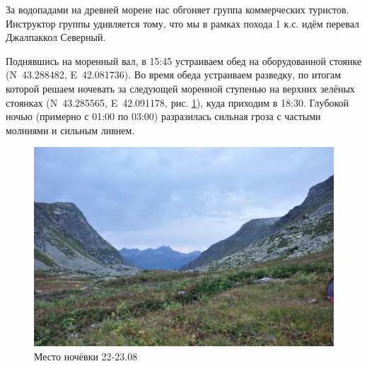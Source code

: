 За водопадами на древней морене нас обгоняет группа коммерческих туристов. Инструктор группы удивляется тому, что мы в рамках похода 1 к.с. идём перевал Джалпаккол Северный.

Поднявшись на моренный вал, в 15:45 устраиваем обед на оборудованной стоянке (N~43.288482\degree, E~42.081736\degree). Во время обеда устраиваем разведку, по итогам которой решаем ночевать за следующей моренной ступенью на верхних зелёных стоянках (N~43.285565\degree, E~42.091178\degree, рис. \ref{fig:DSC_0018}), куда приходим в 18:30. Глубокой ночью (примерно с 01:00 по 03:00) разразилась сильная гроза с частыми молниями и сильным ливнем.

\begin{figure}[h!]
	\centering
	\includegraphics[width=0.7\linewidth]{../pics/DSC_0018}
	\caption{Место ночёвки 22-23.08}
	\label{fig:DSC_0018}
\end{figure}

\clearpage